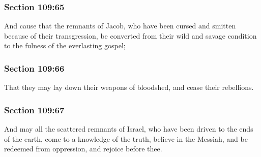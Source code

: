 	\subsubsection{Section 109:65} %
		\label{DC109-65}

		And cause that the remnants of Jacob, who have been cursed and smitten because of their transgression, be converted from their wild and savage condition to the fulness of the everlasting gospel;


	\subsubsection{Section 109:66} %
		\label{DC109-66}

		That they may lay down their weapons of bloodshed, and cease their rebellions.


	\subsubsection{Section 109:67} %
		\label{DC109-67}

		And may all the scattered remnants of Israel, who have been driven to the ends of the earth, come to a knowledge of the truth, believe in the Messiah, and be redeemed from oppression, and rejoice before thee.


